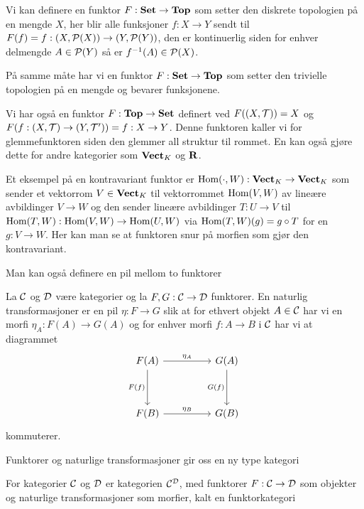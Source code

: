 \begin{eksempel}\label{Ex:DiskFunkt}
    Vi kan definere en funktor $F:\textnormal{\textbf{Set}}\to\textnormal{\textbf{Top}}$ som setter den diskrete topologien på en mengde $X$, her blir alle funksjoner $f: X\to Y$ sendt til $F(f)=f:(X,\mathcal{P}(X))\to (Y,\mathcal{P}(Y))$, den er kontinuerlig siden for enhver delmengde $A\in \mathcal{P}(Y)$ så er $f^{-1}(A)\in\mathcal{P}(X)$.
\end{eksempel}
På samme måte har vi en funktor $F:\textnormal{\textbf{Set}}\to\textnormal{\textbf{Top}}$ som setter den trivielle topologien på en mengde og bevarer funksjonene.

\begin{eksempel}\label{Ex:Glemmefunktor}
    Vi har også en funktor $F:\textnormal{\textbf{Top}}\to\textnormal{\textbf{Set}}$ definert ved $F((X,\mathcal{T})) = X$ og $F(f:(X,\mathcal{T})\to (Y,\mathcal{T}')) = f: X\to Y$. Denne funktoren kaller vi for glemmefunktoren siden den glemmer all struktur til rommet. En kan også gjøre dette for andre kategorier som $\textnormal{\textbf{Vect}}_K$ og $\textnormal{\textbf{{R}}}$.
\end{eksempel}

\begin{eksempel}\label{ex:Homfunkt}
  Et eksempel på en kontravariant funktor er
  $\textnormal{Hom}(\cdot,W):\textnormal{\textbf{Vect}}_K\to\textnormal{\textbf{Vect}}_K$ som sender et vektorrom
  $V\in\textnormal{\textbf{Vect}}_K$ til vektorrommet $\textnormal{Hom}(V,W)$ av lineære
  avbildinger $V\to W$ og den sender lineære avbildinger $T:U\to
  V$ til $\textnormal{Hom}(T,W):\textnormal{Hom}(V,W)\to\textnormal{Hom}(U,W)$ via
  $\textnormal{Hom}(T,W)(g)=g\circ T$ for en $g:V\to W$. Her kan man se at
  funktoren snur på morfien som gjør den kontravariant.
\end{eksempel}

Man kan også definere en pil mellom to funktorer
\begin{definisjon}\label{Def:label}
    La $\mathcal{C}$ og $\mathcal{D}$ være kategorier og la $F,G: \mathcal{C}\to\mathcal{D}$ funktorer. En naturlig transformasjoner er en pil $\eta: F\to G$ slik at for ethvert objekt $A\in \mathcal{C}$ har vi en morfi $\eta_A: F(A)\to G(A)$ og for enhver morfi $f: A\to B$ i $\mathcal{C}$ har vi at diagrammet
    \[\begin{tikzcd}
	{F(A)} && {G(A)} \\
	\\
	{F(B)} && {G(B)}
	\arrow["{\eta_A}", from=1-1, to=1-3]
	\arrow["{F(f)}"', from=1-1, to=3-1]
	\arrow["{G(f)}"', from=1-3, to=3-3]
	\arrow["{\eta_B}", from=3-1, to=3-3]
\end{tikzcd}\]
kommuterer.
\end{definisjon}

Funktorer og naturlige transformasjoner gir oss en ny type kategori 
\begin{definisjon}\label{Def:FunkKat}
    For kategorier $\mathcal{C}$ og $\mathcal{D}$ er kategorien $\mathcal{C}^{\mathcal{D}}$, med funktorer $F:\mathcal{C}\to \mathcal{D}$ som objekter og naturlige transformasjoner som morfier, kalt en funktorkategori
\end{definisjon}

